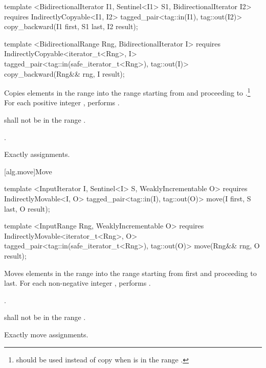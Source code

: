%
\begin{itemdecl}
template <BidirectionalIterator I1, Sentinel<I1> S1, BidirectionalIterator I2>
  requires IndirectlyCopyable<I1, I2>
  tagged_pair<tag::in(I1), tag::out(I2)>
    copy_backward(I1 first, S1 last, I2 result);

template <BidirectionalRange Rng, BidirectionalIterator I>
  requires IndirectlyCopyable<iterator_t<Rng>, I>
  tagged_pair<tag::in(safe_iterator_t<Rng>), tag::out(I)>
    copy_backward(Rng&& rng, I result);
\end{itemdecl}

\begin{itemdescr}
\pnum
\effects
Copies elements in the range 
into the
range 
starting from
and proceeding to .\footnote{
should be used instead of copy when 
is in
the range
.}
For each positive integer
,
performs
.

\pnum
\requires
{}
shall not be in the range
.

\pnum
\returns
{}.

\pnum
\complexity
Exactly
assignments.
\end{itemdescr}

[alg.move]{Move}

%
\begin{itemdecl}
template <InputIterator I, Sentinel<I> S, WeaklyIncrementable O>
  requires IndirectlyMovable<I, O>
  tagged_pair<tag::in(I), tag::out(O)>
    move(I first, S last, O result);

template <InputRange Rng, WeaklyIncrementable O>
  requires IndirectlyMovable<iterator_t<Rng>, O>
  tagged_pair<tag::in(safe_iterator_t<Rng>), tag::out(O)>
    move(Rng&& rng, O result);
\end{itemdecl}

\begin{itemdescr}
\pnum
\effects
Moves elements in the range 
into the range 
starting from first and proceeding to last.
For each non-negative integer
,
performs
.

\pnum
\returns
{}.

\pnum
\requires
{}
shall not be in the range
.

\pnum
\complexity
Exactly
move assignments.
\end{itemdescr}

